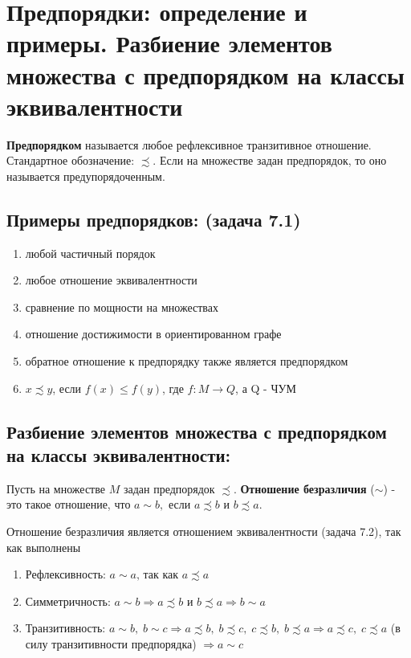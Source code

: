 \setcounter{section}{22}

\section{Предпорядки: определение и примеры. Разбиение элементов множества с предпорядком на классы эквивалентности}
\par \textbf{Предпорядком} называется любое рефлексивное транзитивное отношение. Стандартное обозначение: $\precsim$. Если на множестве задан предпорядок, то оно называется предупорядоченным.
\subsection*{Примеры предпорядков: (задача 7.1)} 
\begin{enumerate}
    \item любой частичный порядок
    \item любое отношение эквивалентности 
    \item сравнение по мощности на множествах 
    \item отношение достижимости в ориентированном графе
    \item обратное отношение к предпорядку также является предпорядком
    \item $x \precsim y$, если $f(x) \leq f(y)$, где $f:M \rightarrow Q$, а Q - ЧУМ
\end{enumerate}
\subsection*{Разбиение элементов множества с предпорядком на классы эквивалентности: }
\par Пусть на множестве $M$ задан предпорядок $\precsim$. \textbf{Отношение безразличия} ($\sim$) - это такое отношение, что $a \sim b, \mbox{ если } a \precsim b \mbox{ и } b \precsim a$.
\par Отношение безразличия является отношением эквивалентности (задача 7.2), так как выполнены
\begin{enumerate}
    \item Рефлексивность: $a \sim a \mbox{, так как } a \precsim a$
    \item Симметричность: $a \sim b \Rightarrow a \precsim b \mbox{ и } b \precsim a \Rightarrow b \sim a$
    \item \par Транзитивность: $a \sim b, \; b \sim c \Rightarrow a \precsim b, \; b \precsim c, \; c \precsim b, \; b \precsim a \Rightarrow a \precsim c, \; c \precsim a$ (в силу транзитивности предпорядка) $\Rightarrow a \sim c$
\end{enumerate}

